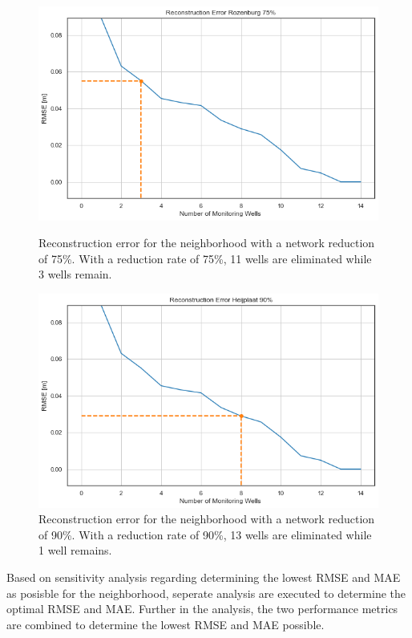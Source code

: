 \clearpage
\begin{figure}[htbp]
    \centering
    \begin{minipage}{0.45\linewidth}
        \includegraphics[width=\linewidth]{75heij.png}
        \caption{Reconstruction error for the neighborhood with a network reduction of 75\%. With a reduction rate of 75\%, 11 wells are eliminated while 3 wells remain.}
        \label{fig:third-figure}
    \end{minipage}
    \hfill
    \begin{minipage}{0.45\linewidth}
        \includegraphics[width=\linewidth]{90heij.png}
        \caption{Reconstruction error for the neighborhood with a network reduction of 90\%. With a reduction rate of 90\%, 13 wells are eliminated while 1 well remains.}
        \label{fig:fourth-figure}
    \end{minipage}
\end{figure}

Based on sensitivity analysis regarding determining the lowest RMSE and MAE as posisble for the neighborhood, seperate analysis are executed to determine the optimal RMSE and MAE. Further in the analysis, the two performance metrics are combined to determine the lowest RMSE and MAE possible. 

